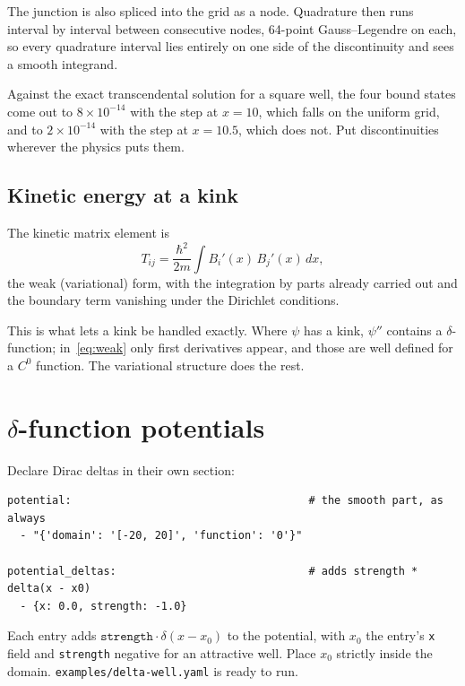 \documentclass[11pt]{article}
\newcommand{\file}[1]{\texttt{#1}}
\begin{document}
The junction is also spliced into the grid as a node. Quadrature then runs
interval by interval between consecutive nodes, 64-point Gauss--Legendre on
each, so every quadrature interval lies entirely on one side of the
discontinuity and sees a smooth integrand.

Against the exact transcendental solution for a square well, the four bound
states come out to $8\times10^{-14}$ with the step at $x=10$, which falls on
the uniform grid, and to $2\times10^{-14}$ with the step at $x=10.5$, which does
not. Put discontinuities wherever the physics puts them.

\subsection{Kinetic energy at a kink}

The kinetic matrix element is
\begin{equation}
  T_{ij} = \frac{\hbar^{2}}{2m}\int B_i'(x)\,B_j'(x)\,dx,
  \label{eq:weak}
\end{equation}
the weak (variational) form, with the integration by parts already carried out
and the boundary term vanishing under the Dirichlet conditions.

This is what lets a kink be handled exactly. Where $\psi$ has a kink, $\psi''$
contains a $\delta$-function; in~\eqref{eq:weak} only first derivatives appear,
and those are well defined for a $C^{0}$ function. The variational structure
does the rest.

\section{\texorpdfstring{$\delta$}{delta}-function potentials}
\label{sec:delta}

Declare Dirac deltas in their own section:

\begin{lstlisting}[style=yaml]
potential:                                     # the smooth part, as always
  - "{'domain': '[-20, 20]', 'function': '0'}"

potential_deltas:                              # adds strength * delta(x - x0)
  - {x: 0.0, strength: -1.0}
\end{lstlisting}

Each entry adds $\texttt{strength}\cdot\delta(x - x_0)$ to the potential, with
$x_0$ the entry's \texttt{x} field and \texttt{strength} negative for an
attractive well. Place $x_0$ strictly inside the domain.
\file{examples/delta-well.yaml} is ready to run.
\end{document}
